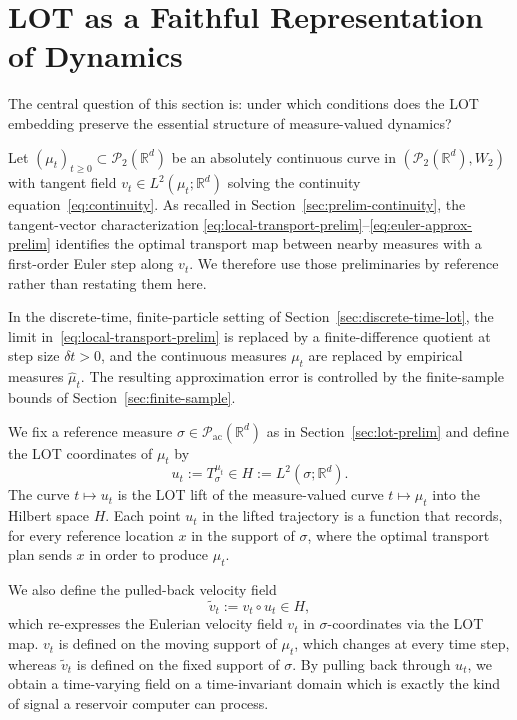 \documentclass[11pt]{article}
\newcommand{\R}{\mathbb{R}}
\newcommand{\1}{\mathbf{1}}
\begin{document}
\section{LOT as a Faithful Representation of Dynamics}\label{sec:lot-faithful}

The central question of this section is: under which conditions does the LOT embedding preserve the essential structure of measure-valued dynamics?

Let $(\mu_t)_{t\ge 0} \subset \mathcal{P}_2(\R^d)$ be an absolutely continuous curve in $(\mathcal{P}_2(\R^d),W_2)$ with tangent field $v_t \in L^2(\mu_t;\R^d)$ solving the continuity equation~\eqref{eq:continuity}. As recalled in Section~\ref{sec:prelim-continuity}, the tangent-vector characterization \eqref{eq:local-transport-prelim}--\eqref{eq:euler-approx-prelim} identifies the optimal transport map between nearby measures with a first-order Euler step along $v_t$. We therefore use those preliminaries by reference rather than restating them here.

\begin{remark}\label{rmk:discrete-caveat}
In the discrete-time, finite-particle setting of Section~\ref{sec:discrete-time-lot}, the limit in~\eqref{eq:local-transport-prelim} is replaced by a finite-difference quotient at step size $\delta t > 0$, and the continuous measures $\mu_t$ are replaced by empirical measures $\hat{\mu}_t$. The resulting approximation error is controlled by the finite-sample bounds of Section~\ref{sec:finite-sample}.
\end{remark}

We fix a reference measure $\sigma \in \mathcal{P}_{\mathrm{ac}}(\R^d)$ as in Section~\ref{sec:lot-prelim} and define the LOT coordinates of $\mu_t$ by
\begin{equation}\label{eq:lot-coords}
  u_t := T_\sigma^{\mu_t} \in H := L^2(\sigma;\R^d).
\end{equation}
The curve $t \mapsto u_t$ is the LOT lift of the measure-valued curve $t \mapsto \mu_t$ into the Hilbert space $H$. Each point $u_t$ in the lifted trajectory is a function that records, for every reference location $x$ in the support of $\sigma$, where the optimal transport plan sends $x$ in order to produce $\mu_t$. 

We also define the pulled-back velocity field
\begin{equation}\label{eq:pullback-vel}
  \widetilde{v}_t := v_t \circ u_t \in H,
\end{equation}
which re-expresses the Eulerian velocity field $v_t$ in $\sigma$-coordinates via the LOT map. $v_t$ is defined on the moving support of $\mu_t$, which changes at every time step, whereas $\widetilde{v}_t$ is defined on the fixed support of $\sigma$. By pulling back through $u_t$, we obtain a time-varying field on a time-invariant domain which is exactly the kind of signal a reservoir computer can process. 
\end{document}
